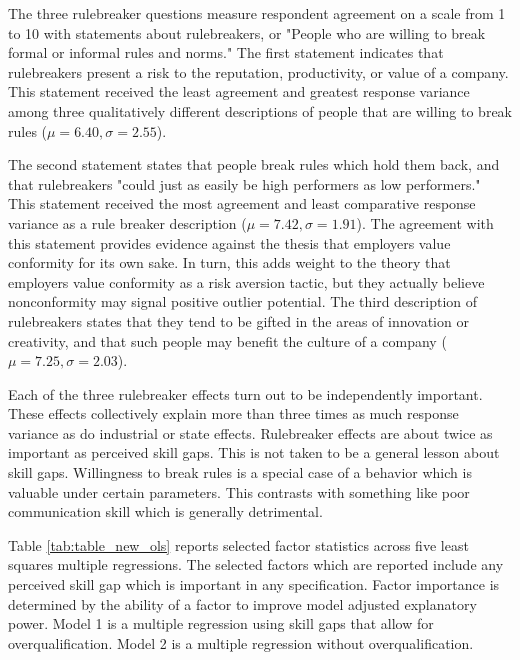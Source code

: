\documentclass[review]{elsarticle}
\begin{document}
The three rulebreaker questions measure respondent agreement on a scale from 1 to 10 with statements about rulebreakers, or "People who are willing to break formal or informal rules and norms."
The first statement indicates that rulebreakers present a risk to the reputation, productivity, or value of a company.
This statement received the least agreement and greatest response variance among three qualitatively different descriptions of people that are willing to break rules ($\mu = 6.40, \sigma = 2.55$).

The second statement states that people break rules which hold them back, and that rulebreakers "could just as easily be high performers as low performers."
This statement received the most agreement and least comparative response variance as a rule breaker description ($\mu = 7.42, \sigma = 1.91$).
The agreement with this statement provides evidence against the thesis that employers value conformity for its own sake.
In turn, this adds weight to the theory that employers value conformity as a risk aversion tactic, but they actually believe nonconformity may signal positive outlier potential.
The third description of rulebreakers states that they tend to be gifted in the areas of innovation or creativity, and that such people may benefit the culture of a company ($\mu = 7.25, \sigma = 2.03$).

Each of the three rulebreaker effects turn out to be independently important.
These effects collectively explain more than three times as much response variance as do industrial or state effects.
Rulebreaker effects are about twice as important as perceived skill gaps.
This is not taken to be a general lesson about skill gaps.
Willingness to break rules is a special case of a behavior which is valuable under certain parameters.
This contrasts with something like poor communication skill which is generally detrimental.

Table \ref{tab:table_new_ols} reports selected factor statistics across five least squares multiple regressions.
The selected factors which are reported include any perceived skill gap which is important in any specification.
Factor importance is determined by the ability of a factor to improve model adjusted explanatory power.
Model 1 is a multiple regression using skill gaps that allow for overqualification.
Model 2 is a multiple regression without overqualification.
\end{document}
